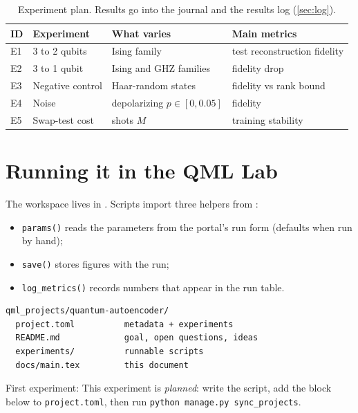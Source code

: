 \documentclass[11pt,a4paper]{article}
\begin{document}
\begin{table}[h]
\centering\small
\begin{tabularx}{\linewidth}{@{}l>{\raggedright}X>{\raggedright}X>{\raggedright\arraybackslash}X@{}}
\toprule
ID & Experiment & What varies & Main metrics \\
\midrule
  E1 & 3 to 2 qubits & Ising family & test reconstruction fidelity \\
  E2 & 3 to 1 qubit & Ising and GHZ families & fidelity drop \\
  E3 & Negative control & Haar-random states & fidelity vs rank bound \\
  E4 & Noise & depolarizing $p\in[0,0.05]$ & fidelity \\
  E5 & Swap-test cost & shots $M$ & training stability \\
\bottomrule
\end{tabularx}
\caption{Experiment plan. Results go into the journal and the results log (\cref{sec:log}).}
\end{table}

\section{Running it in the QML Lab}
The workspace lives in . Scripts import three helpers from
:
\begin{itemize}
  \item \texttt{params()} reads the parameters from the portal's run form (defaults when run by hand);
  \item \texttt{save()} stores figures with the run;
  \item \texttt{log\_metrics()} records numbers that appear in the run table.
\end{itemize}

\begin{lstlisting}
qml_projects/quantum-autoencoder/
  project.toml          metadata + experiments
  README.md             goal, open questions, ideas
  experiments/          runnable scripts
  docs/main.tex         this document
\end{lstlisting}

First experiment: This experiment is \emph{planned}: write the script, add the block below to \texttt{project.toml}, then run \texttt{python manage.py sync\_projects}.
\end{document}
